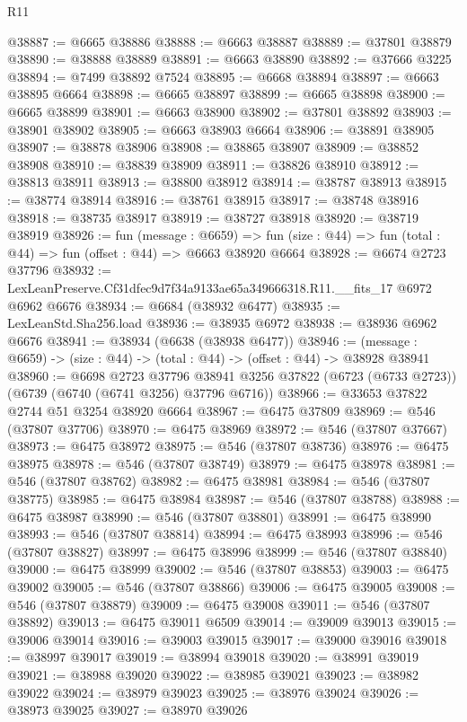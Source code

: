 \begin{lexlean}{R11}
\begin{coremodule}
@38887 := @6665 @38886
@38888 := @6663 @38887
@38889 := @37801 @38879
@38890 := @38888 @38889
@38891 := @6663 @38890
@38892 := @37666 @3225
@38894 := @7499 @38892 @7524
@38895 := @6668 @38894
@38897 := @6663 @38895 @6664
@38898 := @6665 @38897
@38899 := @6665 @38898
@38900 := @6665 @38899
@38901 := @6663 @38900
@38902 := @37801 @38892
@38903 := @38901 @38902
@38905 := @6663 @38903 @6664
@38906 := @38891 @38905
@38907 := @38878 @38906
@38908 := @38865 @38907
@38909 := @38852 @38908
@38910 := @38839 @38909
@38911 := @38826 @38910
@38912 := @38813 @38911
@38913 := @38800 @38912
@38914 := @38787 @38913
@38915 := @38774 @38914
@38916 := @38761 @38915
@38917 := @38748 @38916
@38918 := @38735 @38917
@38919 := @38727 @38918
@38920 := @38719 @38919
@38926 := fun (message : @6659) =>
  fun (size : @44) => fun (total : @44) => fun (offset : @44) => @6663 @38920 @6664
@38928 := @6674 @2723 @37796
@38932 := LexLeanPreserve.Cf31dfec9d7f34a9133ae65a349666318.R11.__fits_17 @6972 @6962 @6676
@38934 := @6684 (@38932 @6477)
@38935 := LexLeanStd.Sha256.load
@38936 := @38935 @6972
@38938 := @38936 @6962 @6676
@38941 := @38934 (@6638 (@38938 @6477))
@38946 := (message : @6659) -> (size : @44) -> (total : @44) -> (offset : @44) -> @38928 @38941
@38960 := @6698
    @2723
    @37796
    @38941
    @3256
    @37822
    (@6723 (@6733 @2723))
    (@6739 (@6740 (@6741 @3256) @37796 @6716))
@38966 := @33653 @37822 @2744 @51 @3254 @38920 @6664
@38967 := @6475 @37809
@38969 := @546 (@37807 @37706)
@38970 := @6475 @38969
@38972 := @546 (@37807 @37667)
@38973 := @6475 @38972
@38975 := @546 (@37807 @38736)
@38976 := @6475 @38975
@38978 := @546 (@37807 @38749)
@38979 := @6475 @38978
@38981 := @546 (@37807 @38762)
@38982 := @6475 @38981
@38984 := @546 (@37807 @38775)
@38985 := @6475 @38984
@38987 := @546 (@37807 @38788)
@38988 := @6475 @38987
@38990 := @546 (@37807 @38801)
@38991 := @6475 @38990
@38993 := @546 (@37807 @38814)
@38994 := @6475 @38993
@38996 := @546 (@37807 @38827)
@38997 := @6475 @38996
@38999 := @546 (@37807 @38840)
@39000 := @6475 @38999
@39002 := @546 (@37807 @38853)
@39003 := @6475 @39002
@39005 := @546 (@37807 @38866)
@39006 := @6475 @39005
@39008 := @546 (@37807 @38879)
@39009 := @6475 @39008
@39011 := @546 (@37807 @38892)
@39013 := @6475 @39011 @6509
@39014 := @39009 @39013
@39015 := @39006 @39014
@39016 := @39003 @39015
@39017 := @39000 @39016
@39018 := @38997 @39017
@39019 := @38994 @39018
@39020 := @38991 @39019
@39021 := @38988 @39020
@39022 := @38985 @39021
@39023 := @38982 @39022
@39024 := @38979 @39023
@39025 := @38976 @39024
@39026 := @38973 @39025
@39027 := @38970 @39026

\end{coremodule}
\end{lexlean}
